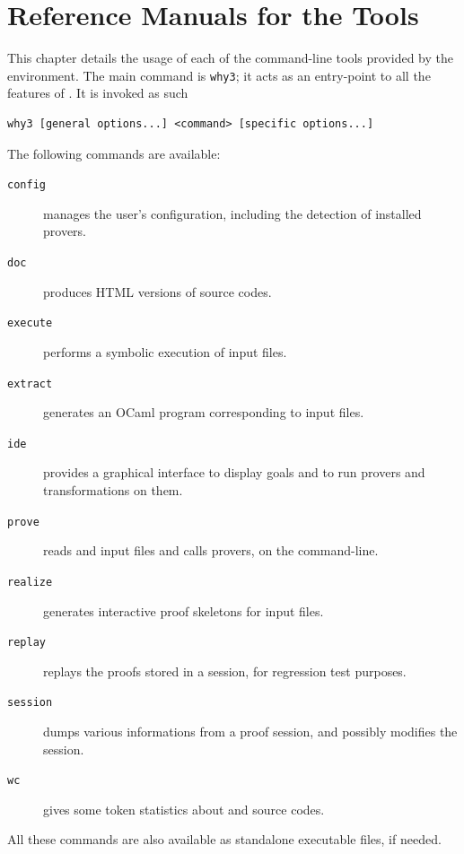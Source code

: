 \chapter{Reference Manuals for the \why Tools}
\label{chap:manpages}

This chapter details the usage of each of the command-line tools
provided by the \why environment. The main command is \texttt{why3};
it acts as an entry-point to all the features of \why. It is invoked
as such
\begin{verbatim}
why3 [general options...] <command> [specific options...]
\end{verbatim}

The following commands are available:
\begin{description}
\item[\texttt{config}] manages the user's configuration,
  including the detection of installed provers.
\item[\texttt{doc}] produces HTML versions of \why source codes.
\item[\texttt{execute}] performs a symbolic execution of \whyml
  input files.
\item[\texttt{extract}] generates an OCaml program corresponding to
  \whyml input files.
\item[\texttt{ide}] provides a graphical interface to display goals
  and to run provers and transformations on them.
\item[\texttt{prove}] reads \why and \whyml input files and calls
  provers, on the command-line.
\item[\texttt{realize}] generates interactive proof skeletons for
  \why input files.
\item[\texttt{replay}] replays the proofs stored in a session,
  for regression test purposes.
\item[\texttt{session}] dumps various informations from a proof
  session, and possibly modifies the session.
\item[\texttt{wc}] gives some token statistics about \why and \whyml
  source codes.
\end{description}

All these commands are also available as standalone executable files,
if needed.


